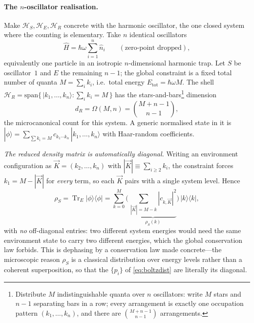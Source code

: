 \documentclass[11pt,a4paper]{article}
\theoremstyle{definition}
\begin{document}
\paragraph{The $n$-oscillator realisation.} Make
$\mathcal H_S,\mathcal H_E,\mathcal H_R$ concrete with the harmonic oscillator,
the one closed system where the counting is elementary. Take $n$ identical
oscillators
\begin{equation}\label{eq:sho-H}
\hat H=\hbar\omega\sum_{i=1}^{n}\hat n_i\qquad(\text{zero-point dropped}),
\end{equation}
equivalently one particle in an isotropic $n$-dimensional harmonic trap. Let $S$
be oscillator~$1$ and $E$ the remaining $n-1$; the global constraint is a fixed
total number of quanta $M=\sum_i k_i$, i.e.\ total energy
$E_{\mathrm{tot}}=\hbar\omega M$. The shell
$\mathcal H_R=\mathrm{span}\{\,|k_1,\dots,k_n\rangle:\sum_i k_i=M\,\}$ has the
stars-and-bars\footnote{Distribute $M$ indistinguishable quanta over $n$
oscillators: write $M$ stars and $n-1$ separating bars in a row; every
arrangement is exactly one occupation pattern
$(k_1,\dots,k_n)$, and there are $\binom{M+n-1}{n-1}$ arrangements.} dimension
\begin{equation}\label{eq:sho-dR}
d_R=\Omega(M,n)=\binom{M+n-1}{\,n-1\,},
\end{equation}
the microcanonical count for this system. A generic normalised state in it is
$|\phi\rangle=\sum_{\sum k_i=M}c_{k_1\cdots k_n}\,|k_1,\dots,k_n\rangle$ with
Haar-random coefficients.

\emph{The reduced density matrix is automatically diagonal.} Writing an
environment configuration as $\vec K=(k_2,\dots,k_n)$ with
$|\vec K|\equiv\sum_{i\ge2}k_i$, the constraint forces $k_1=M-|\vec K|$ for
\emph{every} term, so each $\vec K$ pairs with a single system level. Hence
\begin{equation}\label{eq:sho-rhoS}
\rho_S=\operatorname{Tr}_E|\phi\rangle\langle\phi|
      =\sum_{k=0}^{M}\Big(\,\underbrace{\textstyle\sum_{|\vec K|=M-k}
        |c_{k,\vec K}|^{2}}_{\displaystyle \rho_S(k)}\Big)\,|k\rangle\langle k|,
\end{equation}
with \emph{no} off-diagonal entries: two different system energies would need
the same environment state to carry two different energies, which the global
conservation law forbids. This is dephasing by a conservation law made
concrete---the microscopic reason $\rho_S$ is a classical distribution over
energy levels rather than a coherent superposition, so that the $\{p_i\}$ of
\eqref{eq:boltzdist} are literally its diagonal.
\end{document}
